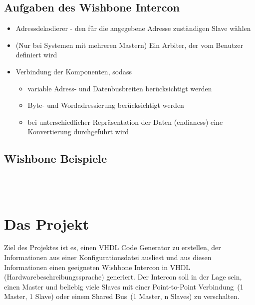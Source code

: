 \documentclass{article}
\begin{document}
\subsection{Aufgaben des Wishbone Intercon}
\begin{itemize}
\item Adressdekodierer - den für die angegebene Adresse zuständigen Slave wählen
\item (Nur bei Systemen mit mehreren Mastern) Ein Arbiter, der vom Benutzer definiert wird
\item Verbindung der Komponenten, sodass
\begin{itemize}
\item variable Adress- und Datenbusbreiten berücksichtigt werden
\item Byte- und Wordadressierung berücksichtigt werden
\item bei unterschiedlicher Repräsentation der Daten (endianess) eine Konvertierung durchgeführt wird
\end{itemize}
\end{itemize}
\subsection{Wishbone Beispiele}

\noindent
{}
\\\\
\noindent
{}

\section{Das Projekt}
Ziel des Projektes ist es, einen VHDL Code Generator zu erstellen,
der Informationen aus einer Konfigurationsdatei ausliest und aus
diesen Informationen einen geeigneten Wishbone Intercon in VHDL (Hardwarebeschreibungssprache) generiert.
Der Intercon soll in der Lage sein, einen Master und beliebig viele Slaves mit einer \glqq Point-to-Point Verbindung\grqq\ (1 Master, 1 Slave) oder einem \glqq Shared Bus\grqq\ (1 Master, n Slaves) zu verschalten.
\end{document}
